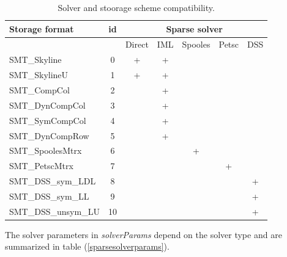 \documentclass[a4paper]{article}
\newcommand{\param}[1]{{\em #1}}
\begin{document}
\begin{table}[h]
\begin{center}
\begin{tabular}{|l|c|c|c|c|c|c|}
\hline
Storage format & id & \multicolumn{5}{c|}{Sparse solver} \\
\hline
 && \tiny{Direct} &\tiny{IML}
 &\tiny{Spooles}& \tiny{Petsc}& \tiny{DSS}\\
\hline
\small{SMT\_Skyline}       & 0&+&+& & & \\
\small{SMT\_SkylineU}      & 1&+&+& & & \\
\small{SMT\_CompCol}       & 2& &+& & & \\
\small{SMT\_DynCompCol}    & 3& &+& & & \\
\small{SMT\_SymCompCol}    & 4& &+& & & \\
\small{SMT\_DynCompRow}    & 5& &+& & & \\
\small{SMT\_SpoolesMtrx}   & 6& & &+& & \\
\small{SMT\_PetscMtrx }    & 7& & & &+& \\
\small{SMT\_DSS\_sym\_LDL} & 8& & & & &+\\
\small{SMT\_DSS\_sym\_LL}  & 9& & & & &+\\
\small{SMT\_DSS\_unsym\_LU}&10& & & & &+\\
\hline
\end{tabular}
\caption{Solver and stoorage scheme compatibility.}
\label{linsolvstoragecompattable}
\end{center}
\end{table}

The solver parameters in \param{solverParams} depend on the solver
type and are summarized in table (\ref{sparsesolverparams}).
\end{document}
